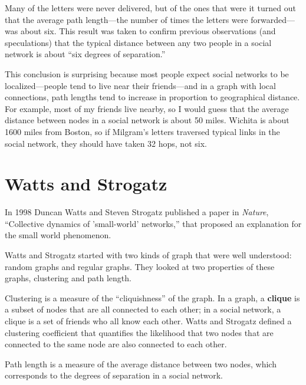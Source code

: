 \documentclass[10pt]{book}
\begin{document}
Many of the letters were never delivered, but of the ones that
were it turned out that the average path length---the number of
times the letters were forwarded---was about six.  This result
was taken to confirm previous observations (and speculations) that
the typical distance between any two people in a social network
is about ``six degrees of separation.''

This conclusion is surprising because most people expect social
networks to be localized---people tend to live near their
friends---and in a graph with local connections, path lengths tend to
increase in proportion to geographical distance.  For example, most of
my friends live nearby, so I would guess that the average distance
between nodes in a social network is about 50 miles.  Wichita is about
1600 miles from Boston, so if Milgram's letters traversed typical
links in the social network, they should have taken 32 hops, not six.


\section{Watts and Strogatz}

In 1998 Duncan Watts and Steven Strogatz published a paper
in {\em Nature}, ``Collective dynamics of 'small-world' networks,''
that proposed an explanation for the small world phenomenon.

Watts and Strogatz started with two kinds of graph that were well
understood: random graphs and regular graphs.  They looked at two
properties of these graphs, clustering and path length.

\begin{description}

\item Clustering is a measure of the ``cliquishness'' of the graph.
In a graph, a {\bf clique} is a subset of nodes that are
all connected to each other; in a social network, a clique is
a set of friends who all know each other.  Watts and Strogatz
defined a clustering coefficient that quantifies the likelihood
that two nodes that are connected to the same node are also
connected to each other.

\item Path length is a measure of the average distance between
two nodes, which corresponds to the degrees of separation in
a social network.

\end{description}
\end{document}
